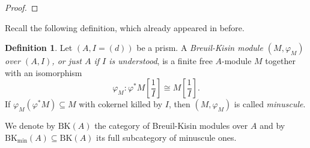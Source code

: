 \documentclass{amsart}
\newcommand{\prism}{{\mathlarger{\mathbbl{\Delta}}}}
\theoremstyle{plain}
\theoremstyle{definition}
\newtheorem{definition}[theorem]{Definition}
\newtheorem{remark}[theorem]{Remark}
\newcommand{\DF}{\mathrm{DF}}
\newcommand{\purple}[1]{{\color{black} #1}}
\newcommand{\blue}[1]{{\color{black}#1}}
\begin{document}
\begin{proof}
\end{proof}

Recall the following definition, which already appeared in  before.


\begin{definition}
  \label{sec:comp-case-mathc-definition-breuil-kisin-module}
  Let $(A,I=(d))$ be a prism. A \textit{Breuil-Kisin module $(M,\varphi_M)$ over $(A,I)$, or just $A$ if $I$ is understood}, is a finite free $A$-module $M$ together with an isomorphism
  $$
  \varphi_M\colon \varphi^{\ast}M[\frac{1}{I}]\cong M[\frac{1}{I}].
  $$
  If $\varphi_M(\varphi^{\ast}M)\subseteq M$ with cokernel \blue{killed by $I$}, then $(M,\varphi_M)$ is called \textit{minuscule}.
  
  We denote by $\mathrm{BK}(A)$ the category of Breuil-Kisin modules over $A$ and by $\mathrm{BK}_{\mathrm{min}}(A)\subseteq \mathrm{BK}(A)$ its full subcategory of minuscule ones.
\end{definition}


\end{document}
